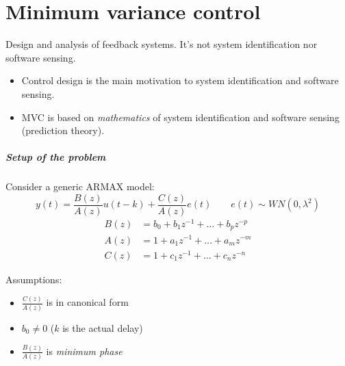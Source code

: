 \chapter{Minimum variance control}

Design and analysis of feedback systems.
It's not system identification nor software sensing.

\begin{itemize}
    \item Control design is the main motivation to system identification and software sensing.
    \item MVC is based on \emph{mathematics} of system identification and software sensing (prediction theory).
\end{itemize}

\paragraph{Setup of the problem} Consider a generic ARMAX model:
\[
    y(t) = \frac{B(z)}{A(z)}u(t-k) + \frac{C(z)}{A(z)}e(t) \qquad e(t) \sim WN(0, \lambda^2)
\]
\begin{align*}
    B(z) &= b_0 + b_1z^{-1} + \dots + b_pz^{-p} \\
    A(z) &= 1   + a_1z^{-1} + \dots + a_mz^{-m} \\
    C(z) &= 1   + c_1z^{-1} + \dots + c_nz^{-n}
\end{align*}

Assumptions:
\begin{itemize}
    \item $\frac{C(z)}{A(z)}$ is in canonical form
    \item $b_0\ne 0$ ($k$ is the actual delay)
    \item $\frac{B(z)}{A(z)}$ is \emph{minimum phase}
\end{itemize}

